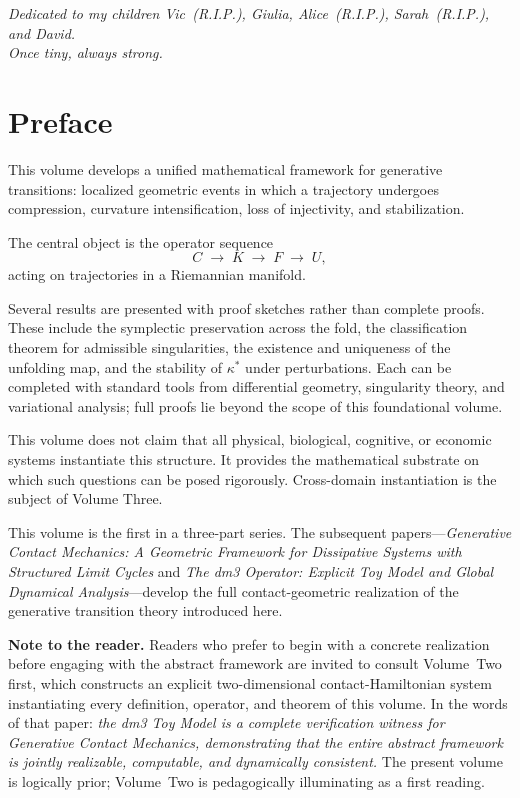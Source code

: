 \documentclass[12pt, oneside]{book}
\theoremstyle{plain}
\theoremstyle{definition}
\theoremstyle{remark}
\begin{document}
\begin{center}
\emph{Dedicated to my children Vic~(R.I.P.), Giulia,
  Alice~(R.I.P.), Sarah~(R.I.P.), and David.}\\[4pt]
\emph{Once tiny, always strong.}
\end{center}

\vspace{1.5em}

\newpage

\section*{Preface}

This volume develops a unified mathematical framework for generative
transitions: localized geometric events in which a trajectory undergoes
compression, curvature intensification, loss of injectivity, and
stabilization.

The central object is the operator sequence
\[
C \;\rightarrow\; K \;\rightarrow\; F \;\rightarrow\; U,
\]
acting on trajectories in a Riemannian manifold.

Several results are presented with proof sketches rather than complete
proofs. These include the symplectic preservation across the fold, the
classification theorem for admissible singularities, the existence and
uniqueness of the unfolding map, and the stability of $\kappa^*$ under
perturbations. Each can be completed with standard tools from
differential geometry, singularity theory, and variational analysis;
full proofs lie beyond the scope of this foundational volume.

This volume does not claim that all physical, biological, cognitive,
or economic systems instantiate this structure. It provides the
mathematical substrate on which such questions can be posed rigorously.
Cross-domain instantiation is the subject of Volume Three.

This volume is the first in a three-part series. The subsequent
papers---\emph{Generative Contact Mechanics: A Geometric Framework for
Dissipative Systems with Structured Limit Cycles} and \emph{The dm3
Operator: Explicit Toy Model and Global Dynamical Analysis}---develop
the full contact-geometric realization of the generative transition
theory introduced here.

\medskip

\noindent\textbf{Note to the reader.}
Readers who prefer to begin with a concrete realization before
engaging with the abstract framework are invited to consult
Volume~Two first, which constructs an explicit two-dimensional
contact-Hamiltonian system instantiating every definition, operator,
and theorem of this volume. In the words of that paper:
\emph{the dm3 Toy Model is a complete verification witness for
Generative Contact Mechanics, demonstrating that the entire abstract
framework is jointly realizable, computable, and dynamically consistent.}
The present volume is logically prior; Volume~Two is pedagogically
illuminating as a first reading.
\end{document}
